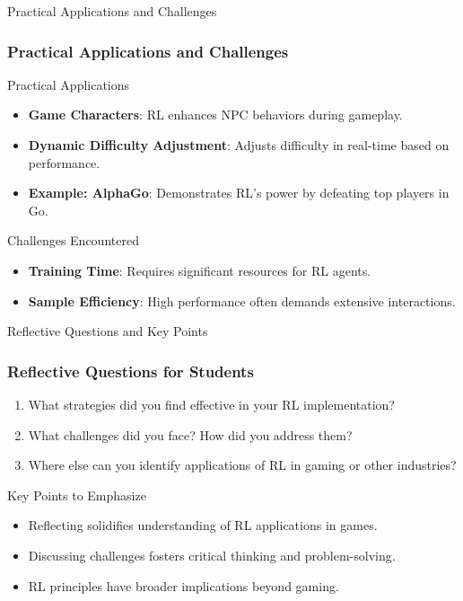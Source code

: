 \documentclass[aspectratio=169]{beamer}
\begin{document}
\begin{frame}[fragile]{Practical Applications and Challenges}
    \frametitle{Practical Applications and Challenges}
    \begin{block}{Practical Applications}
        \begin{itemize}
            \item \textbf{Game Characters}: RL enhances NPC behaviors during gameplay.
            \item \textbf{Dynamic Difficulty Adjustment}: Adjusts difficulty in real-time based on performance.
            \item \textbf{Example: AlphaGo}: Demonstrates RL's power by defeating top players in Go.
        \end{itemize}
    \end{block}

    \begin{block}{Challenges Encountered}
        \begin{itemize}
            \item \textbf{Training Time}: Requires significant resources for RL agents.
            \item \textbf{Sample Efficiency}: High performance often demands extensive interactions.
        \end{itemize}
    \end{block}
\end{frame}

\begin{frame}[fragile]{Reflective Questions and Key Points}
    \frametitle{Reflective Questions for Students}
    \begin{enumerate}
        \item What strategies did you find effective in your RL implementation?
        \item What challenges did you face? How did you address them?
        \item Where else can you identify applications of RL in gaming or other industries?
    \end{enumerate}
    
    \begin{block}{Key Points to Emphasize}
        \begin{itemize}
            \item Reflecting solidifies understanding of RL applications in games.
            \item Discussing challenges fosters critical thinking and problem-solving.
            \item RL principles have broader implications beyond gaming.
        \end{itemize}
    \end{block}
\end{frame}
\end{document}

